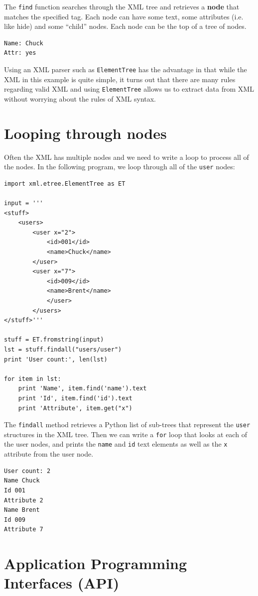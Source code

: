 The {\tt find} function searches through the 
XML tree and retrieves a {\bf node} that matches the specified tag.
Each node can have some text, some attributes (i.e. like hide) and
some ``child'' nodes.   Each node can be the top of a tree of nodes.

\beforeverb
\begin{verbatim}
Name: Chuck
Attr: yes
\end{verbatim}
\afterverb
%
Using an XML parser such as {\tt ElementTree} has the advantage
in that while the XML in this example is quite simple, it turns
out that there are many rules regarding valid XML and using 
{\tt ElementTree} allows us to extract data from XML without 
worrying about the rules of XML syntax.

\section{Looping through nodes}

Often the XML has multiple nodes and we need to write a loop
to process all of the nodes.  In the following program, 
we loop through all of the {\tt user} nodes:

\beforeverb
\begin{verbatim}
import xml.etree.ElementTree as ET

input = '''
<stuff>
    <users>
        <user x="2">
            <id>001</id>
            <name>Chuck</name>
        </user>
        <user x="7">
            <id>009</id>
            <name>Brent</name>
            </user>
        </users>
</stuff>'''

stuff = ET.fromstring(input)
lst = stuff.findall("users/user")
print 'User count:', len(lst)

for item in lst:
    print 'Name', item.find('name').text
    print 'Id', item.find('id').text
    print 'Attribute', item.get("x")
\end{verbatim}
\afterverb
%
The {\tt findall} method retrieves a Python list of sub-trees that
represent the {\tt user} structures in the XML tree.  Then we can 
write a {\tt for} loop that looks at each of the user nodes, and 
prints the {\tt name} and {\tt id} text elements as well as the 
{\tt x} attribute from the user node.

\beforeverb
\begin{verbatim}
User count: 2
Name Chuck
Id 001
Attribute 2
Name Brent
Id 009
Attribute 7
\end{verbatim}
\afterverb
%

\section{Application Programming Interfaces (API)}


